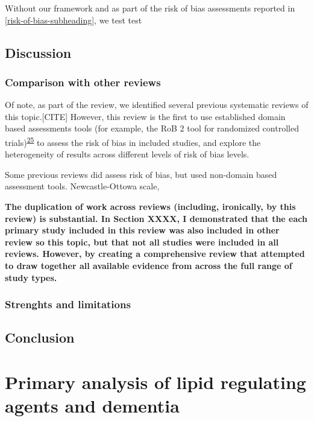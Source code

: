 \documentclass[a4paper, twoside]{templates/ociamthesis}
\begin{document}
Without our framework and as part of the risk of bias assessments reported in \ref{risk-of-bias-subheading}, we test test

\hypertarget{discussion-1}{%
\section{Discussion}\label{discussion-1}}

\hypertarget{comparison-with-other-reviews}{%
\subsection{Comparison with other reviews}\label{comparison-with-other-reviews}}

Of note, as part of the review, we identified several previous systematic reviews of this topic.{[}CITE{]} However, this review is the first to use established domain based assessments tools (for example, the RoB 2 tool for randomized controlled trials)\textsuperscript{\protect\hyperlink{ref-sterne2019}{25}} to assess the risk of bias in included studies, and explore the heterogeneity of results across different levels of risk of bias levels.

Some previous reviews did assess risk of bias, but used non-domain based assessment tools. Newcastle-Ottowa scale,

\textbf{The duplication of work across reviews (including, ironically, by this review) is substantial. In Section XXXX, I demonstrated that the each primary study included in this review was also included in other review so this topic, but that not all studies were included in all reviews. However, by creating a comprehensive review that attempted to draw together all available evidence from across the full range of study types.}

\hypertarget{strenghts-and-limitations}{%
\subsection{Strenghts and limitations}\label{strenghts-and-limitations}}

\hypertarget{conclusion}{%
\section{Conclusion}\label{conclusion}}



\hypertarget{cprd-analysis-heading}{%
\chapter{Primary analysis of lipid regulating agents and dementia}\label{cprd-analysis-heading}}
\end{document}
